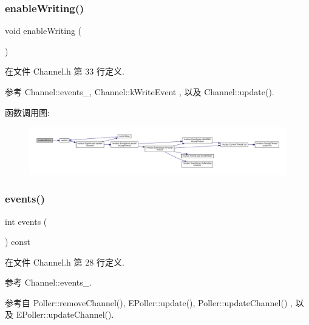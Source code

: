 \subsubsection{\texorpdfstring{enable\+Writing()}{enableWriting()}}
{\footnotesize\ttfamily void enable\+Writing (\begin{DoxyParamCaption}{ }\end{DoxyParamCaption})\hspace{0.3cm}{\ttfamily [inline]}}



在文件 Channel.\+h 第 33 行定义.



参考 Channel\+::events\+\_\+, Channel\+::k\+Write\+Event , 以及 Channel\+::update().

函数调用图\+:
\nopagebreak
\begin{figure}[H]
\begin{center}
\leavevmode
\includegraphics[width=350pt]{classmuduo_1_1Channel_af1dff4317f202ed06097a1425a4dca6d_cgraph}
\end{center}
\end{figure}
\mbox{\label{classmuduo_1_1Channel_ae4f693c8725a3c04d41dee8bb4266f7e}} 
\subsubsection{\texorpdfstring{events()}{events()}}
{\footnotesize\ttfamily int events (\begin{DoxyParamCaption}{ }\end{DoxyParamCaption}) const\hspace{0.3cm}{\ttfamily [inline]}}



在文件 Channel.\+h 第 28 行定义.



参考 Channel\+::events\+\_\+.



参考自 Poller\+::remove\+Channel(), E\+Poller\+::update(), Poller\+::update\+Channel() , 以及 E\+Poller\+::update\+Channel().

